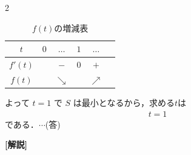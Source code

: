 \documentclass[../../main.tex]{subfiles}
\begin{document}
\begin{multicols}{2}
  \begin{table}[H]
    \centering
    \caption{$f(t)$の増減表}
    \label{1990-4:table:1}
    \begin{tabular}{|c|c|c|c|c|c|}
      \hline
      $t$     & $0$ & $\dots$    & $1$ & $\dots$    & \\
      \hline
      $f'(t)$ &     & $-$        & $0$ & $+$        & \\
      \hline
      $f(t)$  &     & $\searrow$ &     & $\nearrow$ & \\
      \hline
    \end{tabular}
  \end{table}

  よって $t=1$ で $S$ は最小となるから，求める$t$は
  \begin{align}
    t = 1
  \end{align}
  である．$\cdots$(答)

  {\bf [解説]}

  \newpage
\end{multicols}
\end{document}
